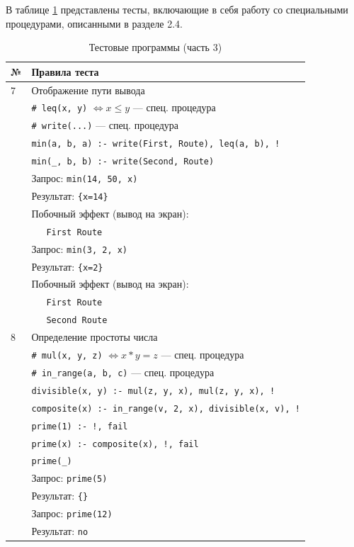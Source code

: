 \clearpage

В таблице \ref{tbl:tests-3} представлены тесты, включающие в себя работу со специальными процедурами, описанными в разделе 2.4.

\begin{table}[ht]
  \caption{Тестовые программы (часть 3)}
  \label{tbl:tests-3}
  \centering
  \begin{tabular}{|l|l|}
    \hline
    \textbf{№} & \textbf{Правила теста} \\
    \hline
    \hline
    7 & Отображение пути вывода \\
    \hline
    & \texttt{\# leq(x, y)} $\Leftrightarrow x \le y$ --- спец. процедура \\
    & \texttt{\# write(...)} --- спец. процедура \\
    & \texttt{min(a, b, a) :- write(First, Route), leq(a, b), !} \\
    & \texttt{min(\_, b, b) :- write(Second, Route)} \\
    \hline
    & Запрос: \texttt{min(14, 50, x)} \\
    & Результат: \texttt{\{x=14\}} \\
    & Побочный эффект (вывод на экран): \\
    & ~~~\texttt{First Route} \\
    \hline
    & Запрос: \texttt{min(3, 2, x)} \\
    & Результат: \texttt{\{x=2\}} \\
    & Побочный эффект (вывод на экран): \\
    & ~~~\texttt{First Route} \\
    & ~~~\texttt{Second Route} \\
    \hline
    \hline
    8 & Определение простоты числа \\
    \hline
    & \texttt{\# mul(x, y, z)} $\Leftrightarrow x * y = z$ --- спец. процедура \\
    & \texttt{\# in\_range(a, b, c)} --- спец. процедура \\
    & \texttt{divisible(x, y) :- mul(z, y, x), mul(z, y, x), !} \\
    & \texttt{composite(x) :- in\_range(v, 2, x), divisible(x, v), !} \\
    & \texttt{prime(1) :- !, fail} \\
    & \texttt{prime(x) :- composite(x), !, fail} \\
    & \texttt{prime(\_)} \\
    \hline
    & Запрос: \texttt{prime(5)} \\
    & Результат: \texttt{\{\}} \\
    \hline
    & Запрос: \texttt{prime(12)} \\
    & Результат: \texttt{no} \\
    \hline
  \end{tabular}
\end{table}

